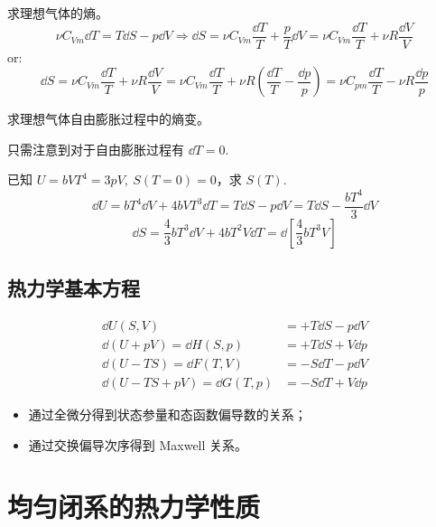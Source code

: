 \begin{framed}
    求理想气体的熵。
    \[
        \nu C_{Vm} \dd{T} = T \dd{S} - p \dd{V} \Rightarrow \dd{S} = \nu C_{Vm} \frac{\dd{T}}{T} + \frac{p}{T} \dd{V} = \nu C_{Vm} \frac{\dd{T}}{T} + \nu R \frac{\dd{V}}{V}
    \]
    or:
    \[
        \dd{S} = \nu C_{Vm} \frac{\dd{T}}{T} + \nu R \frac{\dd{V}}{V} = \nu C_{Vm} \frac{\dd{T}}{T} + \nu R (\frac{\dd{T}}{T} - \frac{\dd{p}}{p}) = \nu C_{pm} \frac{\dd{T}}{T} - \nu R \frac{\dd{p}}{p}
    \]
\end{framed}

\begin{framed}
    求理想气体自由膨胀过程中的熵变。

    只需注意到对于自由膨胀过程有 $\dd{T} = 0$.
\end{framed}

\begin{framed}
    已知 $U = b V T^4 = 3 p V,\ S(T = 0) = 0$，求 $S(T)$.
    \[
        \dd{U} = b T^4 \dd{V} + 4 b V T^3 \dd{T} = T \dd{S} - p \dd{V} = T \dd{S} - \frac{b T^4}{3} \dd{V}
    \]\[
        \dd{S} = \frac{4}{3} b T^3 \dd{V} + 4 b T^2 V \dd{T} = \dd{\left[\frac{4}{3} b T^3 V\right]}
    \]
\end{framed}

\subsection{热力学基本方程}

\begin{align*}
    \dd{U(S, V)}                      & = + T \dd{S} - p \dd{V} \\
    \dd{(U + pV)} = \dd{H(S, p)}      & = + T \dd{S} + V \dd{p} \\
    \dd{(U - TS)} = \dd{F(T, V)}      & = - S \dd{T} - p \dd{V} \\
    \dd{(U - TS + pV)} = \dd{G(T, p)} & = - S \dd{T} + V \dd{p}
\end{align*}

\begin{itemize}
    \item 通过全微分得到状态参量和态函数偏导数的关系；
    \item 通过交换偏导次序得到 Maxwell 关系。
\end{itemize}

\section{均匀闭系的热力学性质}


